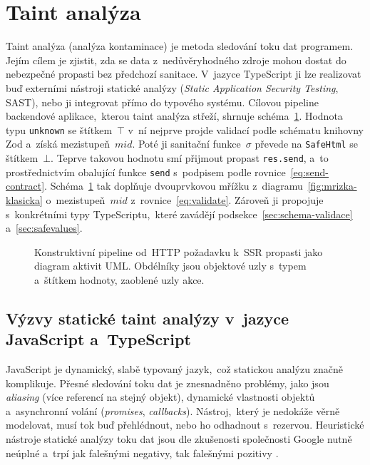 \section{Taint analýza}

Taint analýza (analýza kontaminace) je metoda sledování toku dat programem. Jejím cílem je zjistit, zda se data z~nedůvěryhodného zdroje mohou dostat do nebezpečné propasti bez předchozí sanitace. V~jazyce TypeScript ji lze realizovat buď externími nástroji statické analýzy (\emph{Static Application Security Testing}, SAST), nebo ji integrovat přímo do typového systému. Cílovou pipeline backendové aplikace,~kterou taint analýza střeží, shrnuje schéma~\ref{fig:pipeline}. Hodnota typu \texttt{unknown} se štítkem~$\top$ v~ní nejprve projde validací podle schématu knihovny Zod a~získá mezistupeň~$\mathit{mid}$. Poté ji sanitační funkce~$\sigma$ převede na \texttt{SafeHtml} se štítkem~$\bot$. Teprve takovou hodnotu smí přijmout propast \texttt{res.send}, a~to prostřednictvím obalující funkce \texttt{send} s~podpisem podle rovnice~\ref{eq:send-contract}. Schéma~\ref{fig:pipeline} tak doplňuje dvouprvkovou mřížku z~diagramu~\ref{fig:mrizka-klasicka} o~mezistupeň~$\mathit{mid}$ z~rovnice~\ref{eq:validate}. Zároveň ji propojuje s~konkrétními typy TypeScriptu,~které zavádějí podsekce~\ref{sec:schema-validace} a~\ref{sec:safevalues}.

\begin{figure}[htbp]
    \centering
    \caption[Konstruktivní pipeline od HTTP požadavku k SSR propasti]{Konstruktivní pipeline od~HTTP požadavku k~SSR propasti jako diagram aktivit UML. Obdélníky jsou objektové uzly s~typem a~štítkem hodnoty, zaoblené uzly akce.}
    \label{fig:pipeline}
\end{figure}

\subsection{Výzvy statické taint analýzy v~jazyce JavaScript a~TypeScript}

JavaScript je dynamický, slabě typovaný jazyk,~což statickou analýzu značně komplikuje. Přesné sledování toku dat je znesnadněno problémy, jako jsou \emph{aliasing} (více referencí na stejný objekt), dynamické vlastnosti objektů a~asynchronní volání (\emph{promises}, \emph{callbacks}). Nástroj,~který je nedokáže věrně modelovat, musí tok buď přehlédnout, nebo ho odhadnout s~rezervou. Heuristické nástroje statické analýzy toku dat jsou dle zkušenosti společnosti Google nutně neúplné a~trpí jak falešnými negativy, tak falešnými pozitivy \parencite{kern2014tangled}.

